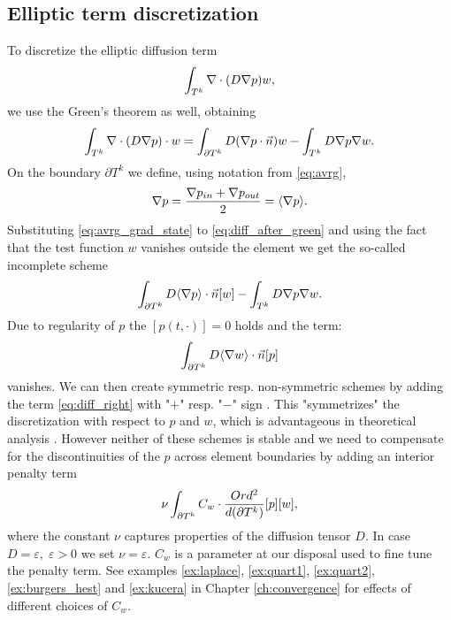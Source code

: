 \subsection{Elliptic term discretization}
\label{se:diff_term}
To discretize the elliptic diffusion term
$$
\int_{T^k}\nabla\cdot(D\nabla p) w,
$$
we use the Green's theorem as well, obtaining
\begin{equation}
\label{eq:diff_after_green}
\int_{T^k}\nabla \cdot (D \nabla p)\cdot w  = \int_{\partial T^k} D(\nabla p\cdot\vec{n}) w - \int_{T^k}
D\nabla p \nabla w.
\end{equation}
On the boundary $\partial T^k$ we define, using notation from \eqref{eq:avrg},
\begin{equation}
\nabla p = \frac{\nabla p_{in} + \nabla p_{out}}{2} = \langle\nabla p\rangle.
\label{eq:avrg_grad_state}
\end{equation}
Substituting \eqref{eq:avrg_grad_state} to \eqref{eq:diff_after_green} and using the fact 
that the test function $w$ vanishes outside the element we get
the so-called incomplete scheme
\begin{equation}
\int_{\partial T^k} D \langle\nabla p\rangle \cdot \vec{n} [w] - \int_{T^k} D\nabla p
\nabla w.
\end{equation}
Due to regularity of $p$ the $[p(t, \cdot)] = 0$ holds \cite[p. 14]{Kucera} and the term:
\begin{equation}
\label{eq:diff_right}
\int_{\partial T^k} D \langle\nabla w \rangle\cdot \vec{n} [p]
\end{equation}
vanishes.
We can then create symmetric resp. non-symmetric schemes by adding the term
\eqref{eq:diff_right} with "$+$" resp. "$-$" sign \cite[p. 14]{Kucera}. This
"symmetrizes" the discretization with respect to $p$ and $w$, which is advantageous in
theoretical analysis \cite[p. 39]{Dolejsi2015}.
However neither of these schemes is stable and we need to compensate for the
discontinuities of the $p$ across element boundaries by adding an interior penalty term
\cite{Kucera, Antonietti2013, Dolejsi2015}
\begin{equation}
\nu \int_{\partial T^k} C_w \cdot \frac{Ord^2}{d(\partial T^k)} [p][w],
\end{equation}
where the constant $\nu$ captures properties of the diffusion tensor $D$. In case $D =
\varepsilon, \; \varepsilon > 0$ we set $\nu = \varepsilon$. $C_w$ is
a parameter at our disposal used to fine tune the penalty term.
See examples \ref{ex:laplace}, \ref{ex:quart1}, \ref{ex:quart2},
\ref{ex:burgers_hest} and \ref{ex:kucera} in Chapter
\ref{ch:convergence} for effects of different choices of $C_w$.
